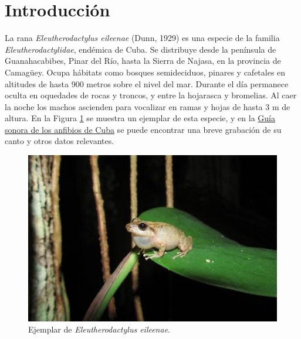 \chapter*{Introducción}\label{chapter:introduction}

\qquad 

La rana \emph{Eleutherodactylus eileenae} (Dunn, 1929) es una especie 
de la familia \emph{Eleutherodactylidae}, endémica de Cuba. 
Se distribuye desde la península de Guanahacabibes, Pinar del Río, 
hasta la Sierra de Najasa, en la provincia de Camagüey. 
Ocupa hábitats como bosques semideciduos, pinares y cafetales
en altitudes de hasta 900 metros sobre el nivel del mar. 
Durante el día permanece oculta en
oquedades de rocas y troncos, y entre la hojarasca y bromelias.
Al caer la noche los machos ascienden 
para vocalizar en ramas y hojas de hasta 3 m de altura. \cite{alonso2001patrones}
En la Figura \ref{fig:colin} se muestra un ejemplar de esta especie, y en la
\href{https://www.fonozoo.com/fnz_detalles_registro_amphibia.php?id=97953&tipo_registro=1}{Guía sonora de los anfibios de Cuba}
se puede encontrar una breve grabación de su canto y otros datos relevantes.\\

\begin{figure}[h!]
    \centering
    \includegraphics[width=\columnwidth]{Graphics/colin.jpg}
    \caption{Ejemplar de \emph{Eleutherodactylus eileenae}.}
    \label{fig:colin}
\end{figure}


